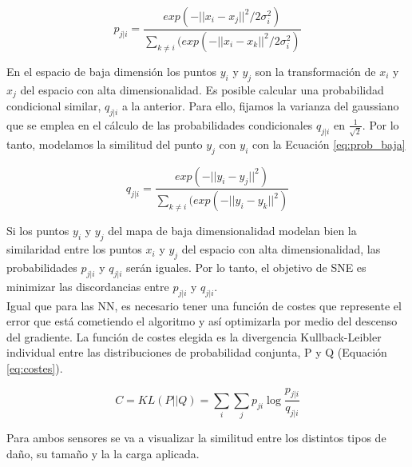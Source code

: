 \begin{equation}
	p_{j|i} = \frac{exp(-||x_i-x_j||^2/2\sigma ^2_i)}{\sum_{k\neq i}( exp(-||x_i-x_k||^2/2\sigma ^2_i)}
	\label{eq:prob_alta}
\end{equation}
\vspace{4pt}

En el espacio de baja dimensión los puntos $y_i$ y $y_j$ son la transformación de $x_i$ y $x_j$ del espacio con alta dimensionalidad. Es posible calcular una probabilidad condicional similar, $q_{j|i}$ a la anterior. Para ello, fijamos la varianza del gaussiano que se emplea en el cálculo de las probabilidades condicionales $q_{j|i}$ en $\frac{1}{\sqrt{2}}$. Por lo tanto, modelamos la similitud del punto $y_j$ con $y_i$ con la Ecuación \ref{eq:prob_baja}

\begin{equation}
	q_{j|i} = \frac{exp(-||y_i-y_j||^2)}{\sum_{k\neq i}(exp(-||y_i-y_k||^2)}
	\label{eq:prob_baja}
\end{equation}
\vspace{4pt}

Si los puntos $y_i$ y $y_j$ del mapa de baja dimensionalidad modelan bien la similaridad entre los puntos $x_i$ y $y_j$ del espacio con alta dimensionalidad, las probabilidades $p_{j|i}$ y $q_{j|i}$ serán iguales. Por lo tanto, el objetivo de SNE es minimizar las discordancias entre $p_{j|i}$ y $q_{j|i}$.\\

Igual que para las NN, es necesario tener una función de costes que represente el error que está cometiendo el algoritmo y así optimizarla por medio del descenso del gradiente. La función de costes elegida es la divergencia Kullback-Leibler individual entre las distribuciones de probabilidad conjunta, P y Q (Equación \ref{eq:costes}).

\begin{equation}
	C = KL(P||Q) = \sum_{i}\sum_{j}p_{ji}\log\frac{p_{j|i}}{q_{j|i}}
	\label{eq:costes}
\end{equation}
\vspace{4pt}

Para ambos sensores se va a visualizar la similitud entre los distintos tipos de daño, su tamaño y la la carga aplicada.

